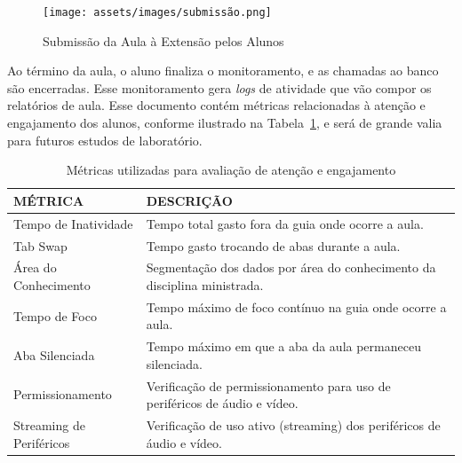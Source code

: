 \begin{figure}[ht]
\centering
\texttt{[image: assets/images/submissão.png]}
\caption{Submissão da Aula à Extensão pelos Alunos}
\label{fig:figura4}
\end{figure}

Ao término da aula, o aluno finaliza o monitoramento, e as chamadas ao banco são encerradas. Esse monitoramento gera \textit{logs} de atividade que vão compor os relatórios de aula.
Esse documento contém métricas relacionadas à atenção e engajamento dos alunos, conforme ilustrado na Tabela~\ref{tab:table1}, e será de grande valia para futuros estudos de laboratório.

\begin{table}[H]
\centering
\caption{Métricas utilizadas para avaliação de atenção e engajamento}
\label{tab:table1}
\begin{tabular}{|l|p{10cm}|}
\hline
\textbf{MÉTRICA} & \textbf{DESCRIÇÃO} \\
\hline
Tempo de Inatividade & Tempo total gasto fora da guia onde ocorre a aula. \\
\hline
Tab Swap & Tempo gasto trocando de abas durante a aula. \\
\hline
Área do Conhecimento & Segmentação dos dados por área do 
conhecimento da disciplina ministrada. \\
\hline
Tempo de Foco & Tempo máximo de foco contínuo na guia onde ocorre a aula. \\
\hline
Aba Silenciada & Tempo máximo em que a aba da aula permaneceu silenciada. \\
\hline
Permissionamento & Verificação de permissionamento para uso de periféricos de áudio e vídeo. \\
\hline
Streaming de Periféricos & Verificação de uso ativo (streaming) dos periféricos de áudio e vídeo. \\
\hline
\end{tabular}
\end{table}


